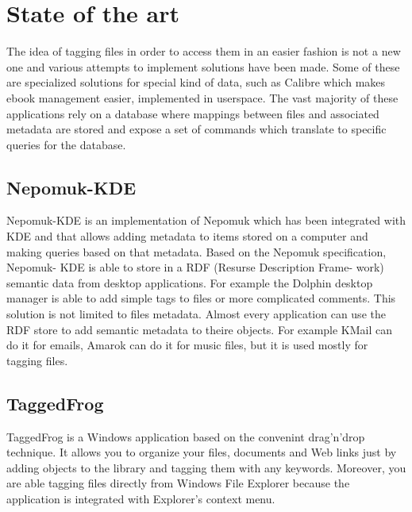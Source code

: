 


\section{State of the art}

The idea of tagging files in order to access them in an easier fashion is not
a new one and various attempts to implement solutions have been made. Some of
these are specialized solutions for special kind of data, such as Calibre\cite{calibre}
which makes ebook management easier, implemented in userspace. The vast majority
of these applications rely on a database where mappings between files and 
associated metadata are stored and expose a set of commands which translate
to specific queries for the database.  

\subsection[Nepomuk-KDE]{Nepomuk-KDE}
Nepomuk-KDE\cite{nepomuk} is an implementation of Nepomuk which
has been integrated with KDE and that allows adding metadata
to items stored on a computer and making queries based on
that metadata. Based on the Nepomuk specification, Nepomuk-
KDE is able to store in a RDF (Resurse Description Frame-
work) semantic data from desktop applications. For example
the Dolphin desktop manager is able to add simple tags to files
or more complicated comments. This solution is not limited
to files metadata. Almost every application can use the RDF
store to add semantic metadata to theire objects. For example
KMail can do it for emails, Amarok can do it for music files,
but it is used mostly for tagging files.


\subsection{TaggedFrog}TaggedFrog\cite{taggedfrog} is a Windows application 
based on the convenint drag'n'drop technique. It allows you to organize your files, 
documents and Web links just by adding objects to the library and tagging them with 
any keywords. Moreover, you are able tagging files directly from Windows File Explorer 
because the application is integrated with Explorer's context menu.

